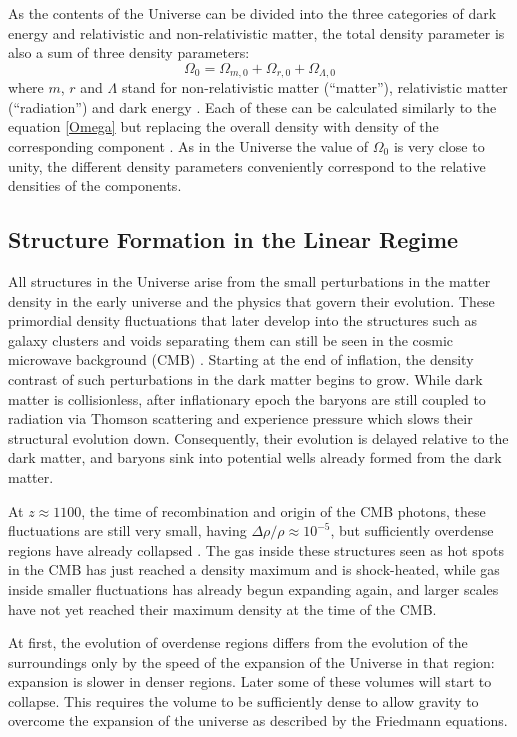 \documentclass[english, oneside]{HYgradu}
\begin{document}
As the contents of the Universe can be divided into the three categories of dark energy and relativistic and non-relativistic matter, the total density parameter is also a sum of three density parameters:
\begin{equation}
\Omega_0 = \Omega_{m,0} + \Omega_{r, 0} + \Omega_{\Lambda, 0}
\end{equation}
where $m$, $r$ and $\Lambda$ stand for non-relativistic matter (``matter''), relativistic matter (``radiation'') and dark energy \citep{mo2010galaxy}. Each of these can be calculated similarly to the equation \ref{Omega} but replacing the overall density with density of the corresponding component \citep{mo2010galaxy}. As in the Universe the value of $\Omega_0$ is very close to unity, the different density parameters conveniently correspond to the relative densities of the components.


\subsection{Structure Formation in the Linear Regime} \label{universe-structure}
All structures in the Universe arise from the small perturbations in the matter density in the early universe and the physics that govern their evolution. These primordial density fluctuations that later develop into the structures such as galaxy clusters and voids separating them can still be seen in the cosmic microwave background (CMB) \citep{planck2016resultsI}. Starting at the end of inflation, the density contrast of such perturbations in the dark matter begins to grow. While dark matter is collisionless, after inflationary epoch the baryons are still coupled to radiation via Thomson scattering and experience pressure which slows their structural evolution down. Consequently, their evolution is delayed relative to the dark matter, and baryons sink into potential wells already formed from the dark matter.

At $z \approx 1100$, the time of recombination and origin of the CMB photons, these fluctuations are still very small, having $\Delta\rho/\rho \approx 10^{-5}$, but sufficiently overdense regions have already collapsed \citep{mo2010galaxy}. The gas inside these structures seen as hot spots in the CMB has just reached a density maximum and is shock-heated, while gas inside smaller fluctuations has already begun expanding again, and larger scales have not yet reached their maximum density at the time of the CMB.

At first, the evolution of overdense regions differs from the evolution of the surroundings only by the speed of the expansion of the Universe in that region: expansion is slower in denser regions. Later some of these volumes will start to collapse. This requires the volume to be sufficiently dense to allow gravity to overcome the expansion of the universe as described by the Friedmann equations.
\end{document}
